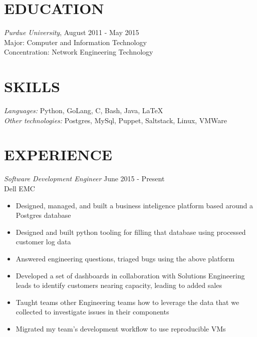 \documentclass[line,margin]{res}
\begin{document}
  \name{\textcolor{TealBlue}{Ethan Madden}}
  \address{ethan@madden.ninja - (812) 250-1419}
  \address{2049 NW 60th St, Seattle WA 98107}

\begin{resume}
  \section{\textcolor{TealBlue}{EDUCATION}} 
    {\sl Purdue University}, \hfill August 2011 - May 2015 \\
      Major: Computer and Information Technology \\
      Concentration: Network Engineering Technology

  \section{\textcolor{TealBlue}{SKILLS}} 
    {\sl Languages:}  Python, GoLang, C, Bash, Java, \LaTeX \\
    {\sl Other technologies:} Postgres, MySql, Puppet, Saltstack, Linux, VMWare

  \section{\textcolor{TealBlue}{EXPERIENCE}} 
    {\sl Software Development Engineer} \hfill June 2015 - Present \\
      Dell EMC
      \begin{itemize}  \itemsep -2pt
        \item Designed, managed, and built a business inteligence platform based around a Postgres database
        \item Designed and built python tooling for filling that database using processed customer log data
        \item Answered engineering questions, triaged bugs using the above platform
        \item Developed a set of dashboards in collaboration with Solutions Engineering leads to identify customers nearing capacity, leading to added sales
        \item Taught teams other Engineering teams how to leverage the data that we collected to investigate issues in their components
        \item Migrated my team's development workflow to use reproducible VMs
      \end{itemize}


\end{resume}
\end{document}
